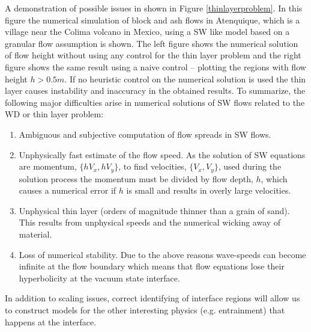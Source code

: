 \documentclass[letterpaper,10pt]{article}
\begin{document}
A demonstration of possible issues in shown in Figure \ref{thinlayerproblem}.
In this figure the numerical simulation of block and ash flows in Atenquique, which is a village near the Colima volcano in Mexico, using a SW like model 
based on a granular flow assumption is shown. The left figure shows the numerical solution of flow height without using any control for the thin layer problem 
and the right figure shows the same result  
using a naive control -- plotting the regions with flow height $h>0.5m$. If no heuristic control on the numerical solution is used the thin layer causes instability and 
inaccuracy in the obtained results.
To summarize, the following major difficulties arise in numerical solutions of SW flows related to the WD or thin layer problem:
\begin{enumerate}
        \item Ambiguous and subjective computation of flow spreads in SW flows.
        \item \label{problemwicking}
             Unphysically fast estimate of the flow speed. As the solution of SW equations are momentum, $\{hV_x,hV_y\}$, to find velocities, $\{V_x,V_y\}$, used during the solution process the
             momentum must be divided by flow depth, $h$, which causes a numerical error if $h$ is small and results in overly large velocities.
        \item \label{problemtoothin}
              Unphysical thin layer (orders of magnitude thinner than a grain of sand). This results from unphysical speeds and the numerical wicking away of material.
        \item \label{problemunstable}
              Loss of numerical stability. Due to the above reasons wave-speeds can become infinite at the flow boundary which means that flow equations lose their hyperbolicity  
              at the vacuum state interface.
\end{enumerate}\label{thinprob}

In addition to scaling issues, correct identifying of interface regions will allow us to construct models for the other interesting physics (e.g. entrainment) that happens at the interface.
\end{document}
